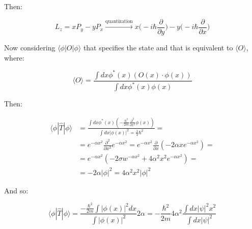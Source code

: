     Then:

    $$L_z = xP_y - yP_x\xrightarrow[]{\text{quantization}}x\biggl(-i\hbar\frac{\partial}{\partial y}\biggr) - y\biggl(-i\hbar\frac{\partial}{\partial x}\biggr)$$

    Now considering $\langle \phi|O|\phi\rangle$ that specifies the state and that is equivalent to $\langle O\rangle$, where:

    $$\langle O\rangle = \frac{\int dx \phi^*(x)(O(x)\cdot\phi(x))}{\int dx\phi^*(x)\phi(x)}$$

    Then:

    \begin{align*}
      \langle\phi|\hat{T}|\phi\rangle &=\frac{\int dx\phi^*(x)(-\frac{\hbar^2}{2m}\frac{\partial^2}{\partial x^2}\phi(x))}{\int dx |\phi(x)|^2 = \frac{1}{4}\hbar^2}=\\
                                      &=e^{-\alpha x^2}\frac{\partial^2}{\partial x^2}e^{-\alpha x^2} = e^{-\alpha x^2}\frac{\partial}{\partial x}(-2\alpha xe^{-\alpha x^2}) =\\
                                      &=e^{-\alpha x^2}(-2\sigma w^{-\alpha x^2}+4\alpha^2x^2e^{-\alpha x^2})= \\
                                      &=-2\alpha|\phi|^2 = 4\alpha^2 x^2|\phi|^2
    \end{align*}

    And so:

    $$\langle\phi|\hat{T}|\phi\rangle = \frac{-\frac{\hbar^2}{2m}\int |\phi(x)|^2dx}{\int|\phi(x)|^2}2\alpha= - \frac{\hbar^2}{2m}4\alpha^2\frac{\int dx|\psi|^2x^2}{\int dx|\psi|^2}$$


